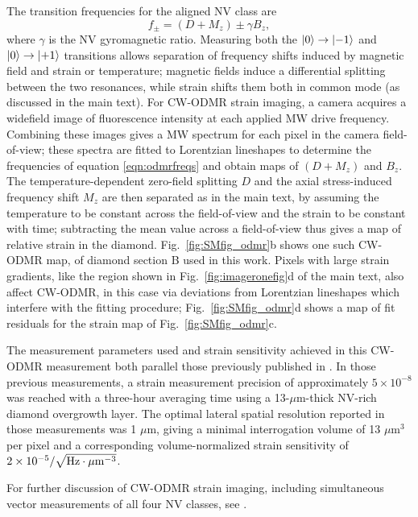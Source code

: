 \documentclass[reprint,superscriptaddress,hyphens,amsmath,amssymb,aps,prx,float]{revtex4-2}
\begin{document}
The transition frequencies for the aligned NV class are 
\begin{equation}
\label{eqn:odmrfreqs}
    f_{\pm}=(D+M_z)\pm\gamma B_z,
\end{equation}
where $\gamma$ is the NV gyromagnetic ratio.  Measuring both the $\ket{0}\rightarrow\ket{-1}$ and $\ket{0}\rightarrow\ket{+1}$ transitions allows separation of frequency shifts induced by magnetic field and strain or temperature; magnetic fields induce a differential splitting between the two resonances, while strain shifts them both in common mode (as discussed in the main text).  For CW-ODMR strain imaging, a camera acquires a widefield image of fluorescence intensity at each applied MW drive frequency.  Combining these images gives a MW spectrum for each pixel in the camera field-of-view; these spectra are fitted to Lorentzian lineshapes to determine the frequencies of equation \eqref{eqn:odmrfreqs} and obtain maps of $(D+M_z)$ and $B_z$.  The temperature-dependent zero-field splitting $D$ and the axial stress-induced frequency shift $M_z$ are then separated as in the main text, by assuming the temperature to be constant across the field-of-view and the strain to be constant with time; subtracting the mean value across a field-of-view thus gives a map of relative strain in the diamond.  Fig.~\ref{fig:SMfig_odmr}b shows one such CW-ODMR map, of diamond section B used in this work.  Pixels with large strain gradients, like the region shown in Fig.~\ref{fig:imageronefig}d of the main text, also affect CW-ODMR, in this case via deviations from Lorentzian lineshapes which interfere with the fitting procedure; Fig.~\ref{fig:SMfig_odmr}d shows a map of fit residuals for the strain map of Fig.~\ref{fig:SMfig_odmr}c.  

The measurement parameters used and strain sensitivity achieved in this CW-ODMR measurement both parallel those previously published in \cite{StrainPaper}.  In those previous measurements, a strain measurement precision of approximately $5\times10^{-8}$ was reached with a three-hour averaging time using a 13-$\mu$m-thick NV-rich diamond overgrowth layer.  The optimal lateral spatial resolution reported in those measurements was 1 $\mu$m, giving a minimal interrogation volume of 13 $\mu$m$^3$ per pixel and a corresponding volume-normalized strain sensitivity of $2\times10^{-5}/\sqrt{\rm{Hz}\cdot\rm{\mu m}^{-3}}$.

For further discussion of CW-ODMR strain imaging, including simultaneous vector measurements of all four NV classes, see \cite{StrainPaper}.

%


\clearpage
\end{document}
